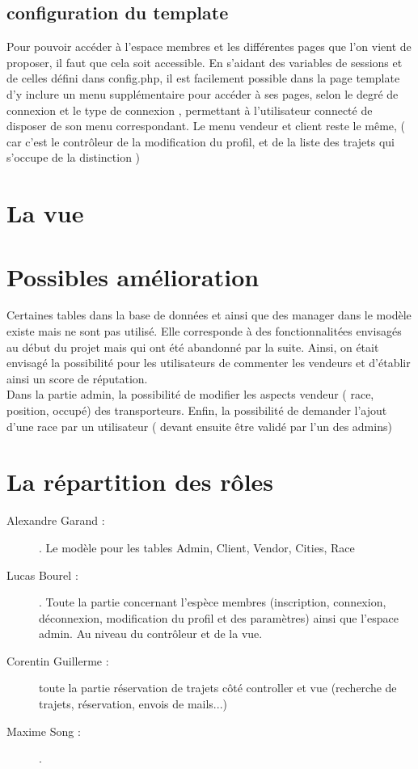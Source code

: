 \documentclass{article}
\begin{document}
\subsection{configuration du template}
Pour pouvoir accéder à l'espace membres et les différentes pages que l'on vient de proposer, il faut que cela soit accessible.  
En s'aidant des variables de sessions et de celles défini dans config.php, il est facilement possible dans la page template d'y inclure un menu supplémentaire pour accéder à ses pages, selon le degré de connexion et le type de connexion , permettant à l'utilisateur connecté de disposer de son menu correspondant. 
Le menu vendeur et client reste le même, ( car c'est le contrôleur de la modification du profil, et de la liste des trajets qui s'occupe de la distinction ) 

\section{La vue}

\section{Possibles amélioration}
Certaines tables dans la base de données et ainsi que des manager dans le modèle existe mais ne sont pas utilisé. 
Elle corresponde à des fonctionnalitées envisagés au début du projet mais qui ont été abandonné par la suite. 
Ainsi, on était envisagé la possibilité pour les utilisateurs de commenter les vendeurs et d'établir ainsi un score de réputation. 
\\
Dans la partie admin, la possibilité de modifier les aspects vendeur ( race, position, occupé) des transporteurs. 
Enfin, la possibilité de demander l'ajout d'une race par un utilisateur ( devant ensuite être validé par l'un des admins)

\section{La répartition des rôles}
\begin{description}
 \item[Alexandre Garand :]. Le modèle pour les tables Admin, Client, Vendor, Cities, Race 
 \\
 
 
 \item[Lucas Bourel :] . Toute la partie concernant l'espèce membres (inscription, connexion, déconnexion, modification du profil et des paramètres) ainsi que l'espace admin. Au niveau du contrôleur et de la vue. 
 \\
 
 \item[Corentin Guillerme :] toute la partie réservation de trajets côté controller et vue (recherche de trajets, réservation, envois de mails...)
 \\
 
 \item[Maxime Song :].
 \\
\end{description}
\end{document}
